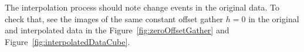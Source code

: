 \indent The interpolation process should note change events in the original data. To check that,
see the images of the same constant offset gather $h=0$ in the original and interpolated data in the
Figure~\ref{fig:zeroOffsetGather} and Figure~\ref{fig:interpolatedDataCube}.




